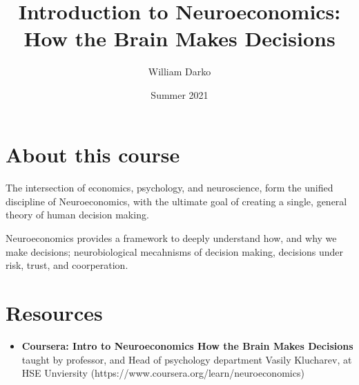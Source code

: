 \documentclass[12pt, a4paper]{article}
\title{Introduction to Neuroeconomics: How the Brain Makes Decisions}
\author{William Darko}
\date{Summer 2021}
\begin{document}
\maketitle
\newpage

\tableofcontents

\newpage

\section{About this course}
\paragraph*{}
The intersection of economics, psychology, and neuroscience, form the unified discipline of
Neuroeconomics, with the ultimate goal of creating a single, general theory of human decision making.

Neuroeconomics provides a framework to deeply understand how, and why we make decisions;
neurobiological mecahnisms of decision making, decisions under risk, trust, and coorperation.


\newpage

\section{Resources}

\begin{itemize}
    \item \textbf{Coursera: Intro to Neuroeconomics How the Brain Makes Decisions} 
    taught by professor, and Head of psychology department Vasily Klucharev, at HSE Unviersity 
    (https://www.coursera.org/learn/neuroeconomics)
\end{itemize}

\newpage
\end{document}
